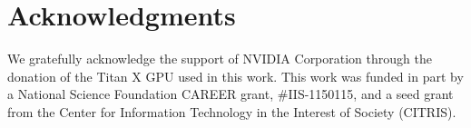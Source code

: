 \documentclass[sigconf]{acmart}
\begin{document}
	
	
	
	
	\section{Acknowledgments}
	We gratefully acknowledge the support of NVIDIA Corporation through the donation of the Titan X GPU used in this work. This work was funded in part by a National Science Foundation CAREER grant, \#IIS-1150115, and a seed grant from the Center for Information
	Technology in the Interest of Society (CITRIS).
	
	
	
	 
	
\end{document}
